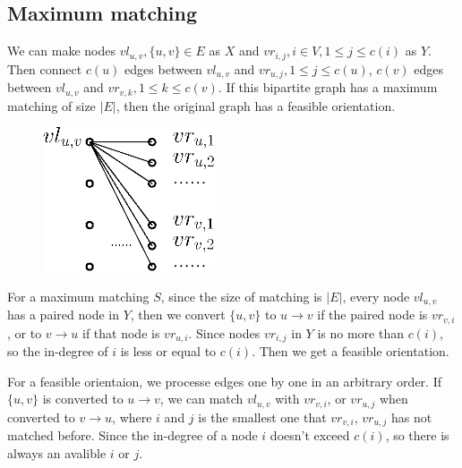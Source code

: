 		\subsection{Maximum matching}
			We can make nodes $vl_{u,v},\{u,v\}\in E$ as $X$ and $vr_{i,j},i\in V,1\leq j\leq c(i)$ as $Y$. Then connect $c(u)$ edges between $vl_{u, v}$ and $vr_{u,j},1\leq j\leq c(u)$, $c(v)$ edges between $vl_{u, v}$ and $vr_{v,k},1\leq k\leq c(v)$. If this bipartite graph has a maximum matching of size $|E|$, then the original graph has a feasible orientation.\par
			\begin{figure}[H]
				\centering\includegraphics[width=2in]{source/qwd/qb.eps}
			\end{figure}
			For a maximum matching $S$, since the size of matching is $|E|$, every node $vl_{u, v}$ has a paired node in $Y$, then we convert $\{u, v\}$ to $u\to v$ if the paired node is $vr_{v,i}$, or to $v\to u$ if that node is $vr_{u,i}$. Since nodes $vr_{i, j}$ in $Y$ is no more than $c(i)$, so the in-degree of $i$ is less or equal to $c(i)$. Then we get a feasible orientation.\par
			For a feasible orientaion, we processe edges one by one in an arbitrary order. If $\{u, v\}$ is converted to $u\to v$, we can match $vl_{u, v}$ with $vr_{v, i}$, or $vr_{u, j}$ when converted to $v\to u$, where $i$ and $j$ is the smallest one that $vr_{v, i}$, $vr_{u, j}$ has not matched before. Since the in-degree of a node $i$ doesn't exceed $c(i)$, so there is always an avalible $i$ or $j$.